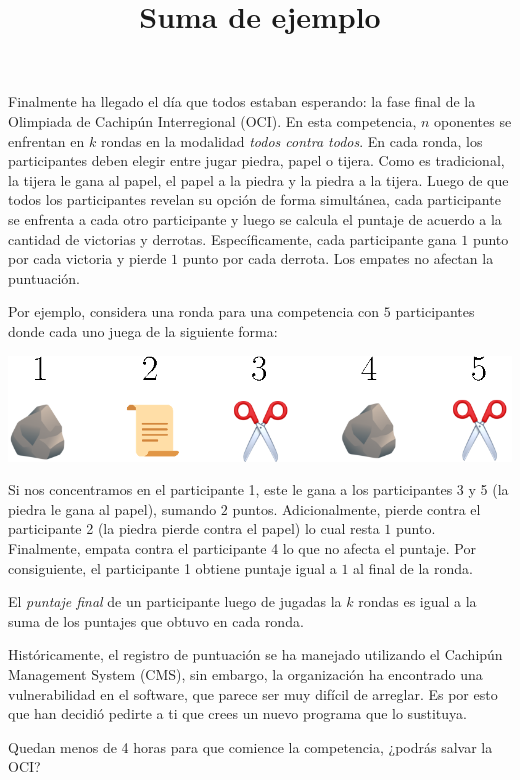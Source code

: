 \documentclass{oci}
\title{Suma de ejemplo}
\begin{document}
\begin{problemDescription}
  Finalmente ha llegado el día que todos estaban esperando:
  la fase final de la Olimpiada de Cachipún Interregional (OCI).
  En esta competencia, $n$ oponentes se enfrentan en $k$ rondas
  en la modalidad \emph{todos contra todos}.
  En cada ronda, los participantes deben elegir entre jugar piedra, papel o tijera.
  Como es tradicional, la tijera le gana al papel, el papel a la piedra y la piedra a
  la tijera.
  Luego de que todos los participantes revelan su opción de forma simultánea, cada participante 
  se enfrenta a cada otro participante y luego se
  calcula el puntaje de acuerdo a la cantidad de victorias y derrotas.
  Específicamente, cada participante gana $1$ punto por cada victoria
  y pierde $1$ punto por cada derrota.
  Los empates no afectan la puntuación.

  Por ejemplo, considera una ronda para una competencia con $5$ participantes donde
  cada uno juega de la siguiente forma:
  \begin{center}
    \includegraphics[scale=0.8]{ronda.eps}
  \end{center}
  Si nos concentramos en el participante 1, este le gana a los participantes 3 y 5
  (la piedra le gana al papel), sumando $2$ puntos.
  Adicionalmente, pierde contra el participante 2 (la piedra pierde contra el papel)
  lo cual resta $1$ punto.
  Finalmente, empata contra el participante 4 lo que no afecta el puntaje.
  Por consiguiente, el participante 1 obtiene puntaje igual a $1$ al final de la ronda.

  El \emph{puntaje final} de un participante luego de jugadas la $k$ rondas
  es igual a la suma de los puntajes que obtuvo en cada ronda.

  Históricamente, el registro de puntuación se ha manejado utilizando el
  Cachipún Management System (CMS), sin embargo, la organización ha encontrado
  una vulnerabilidad en el software, que parece ser muy difícil de arreglar.
  Es por esto que han decidió pedirte a ti que crees un nuevo programa que lo
  sustituya.

  Quedan menos de 4 horas para que comience la competencia, ¿podrás salvar la OCI?
\end{problemDescription}
\end{document}
